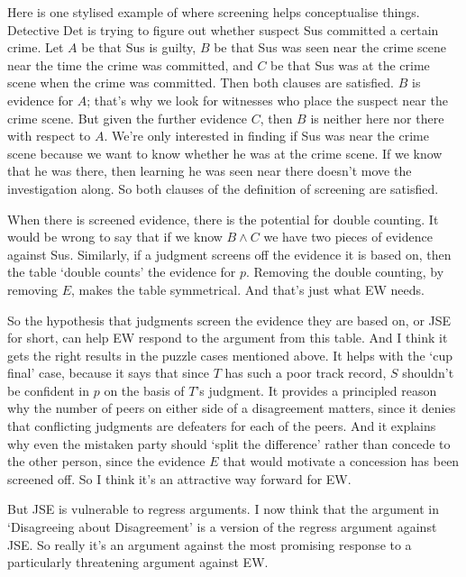 \noindent Here is one stylised example of where screening helps conceptualise things. Detective Det is trying to figure out whether suspect Sus committed a certain crime. Let \(A\) be that Sus is guilty, \(B\) be that Sus was seen near the crime scene near the time the crime was committed, and \(C\) be that Sus was at the crime scene when the crime was committed. Then both clauses are satisfied. \(B\) is evidence for \(A\); that's why we look for witnesses who place the suspect near the crime scene. But given the further evidence \(C\), then \(B\) is neither here nor there with respect to \(A\). We're only interested in finding if Sus was near the crime scene because we want to know whether he was at the crime scene. If we know that he was there, then learning he was seen near there doesn't move the investigation along. So both clauses of the definition of screening are satisfied.

When there is screened evidence, there is the potential for double counting. It would be wrong to say that if we know $B \wedge C$ we have two pieces of evidence against Sus. Similarly, if a judgment screens off the evidence it is based on, then the table `double counts' the evidence for $p$. Removing the double counting, by removing $E$, makes the table symmetrical. And that's just what EW needs.

So the hypothesis that judgments screen the evidence they are based on, or JSE for short, can help EW respond to the argument from this table. And I think it gets the right results in the puzzle cases mentioned above. It helps with the `cup final' case, because it says that since $T$ has such a poor track record, $S$ shouldn't be confident in $p$ on the basis of $T$'s judgment. It provides a principled reason why the number of peers on either side of a disagreement matters, since it denies that conflicting judgments are defeaters for each of the peers. And it explains why even the mistaken party should `split the difference' rather than concede to the other person, since the evidence $E$ that would motivate a concession has been screened off. So I think it's an attractive way forward for EW.

But JSE is vulnerable to regress arguments. I now think that the argument in `Disagreeing about Disagreement' is a version of the regress argument against JSE. So really it's an argument against the most promising response to a particularly threatening argument against EW.


